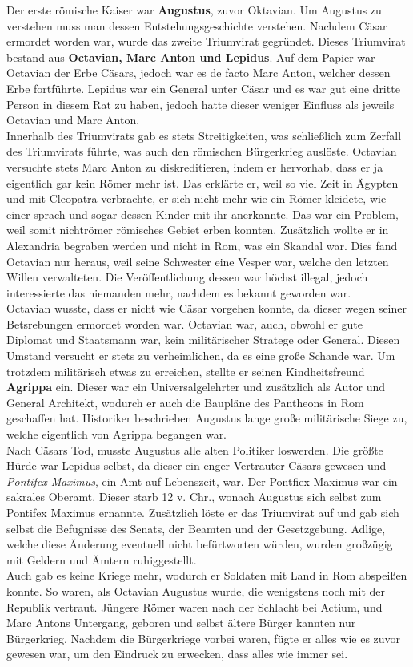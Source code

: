 \documentclass{article}
\begin{document}
	Der erste römische Kaiser war \textbf{Augustus}, zuvor Oktavian. Um Augustus zu verstehen muss man dessen Entstehungsgeschichte verstehen. Nachdem Cäsar ermordet worden war, wurde das zweite Triumvirat gegründet. Dieses Triumvirat bestand aus \textbf{Octavian, Marc Anton und Lepidus}. Auf dem Papier war Octavian der Erbe Cäsars, jedoch war es de facto Marc Anton, welcher dessen Erbe fortführte. Lepidus war ein General unter Cäsar und es war gut eine dritte Person in diesem Rat zu haben, jedoch hatte dieser weniger Einfluss als jeweils Octavian und Marc Anton. \\
	Innerhalb des Triumvirats gab es stets Streitigkeiten, was schließlich zum Zerfall des Triumvirats führte, was auch den römischen Bürgerkrieg auslöste. Octavian versuchte stets Marc Anton zu diskreditieren, indem er hervorhab, dass er ja eigentlich gar kein Römer mehr ist. Das erklärte er, weil so viel Zeit in Ägypten und mit Cleopatra verbrachte, er sich nicht mehr wie ein Römer kleidete, wie einer sprach und sogar dessen Kinder mit ihr anerkannte. Das war ein Problem, weil somit nichtrömer römisches Gebiet erben konnten. Zusätzlich wollte er in Alexandria begraben werden und nicht in Rom, was ein Skandal war. Dies fand Octavian nur heraus, weil seine Schwester eine Vesper war, welche den letzten Willen verwalteten. Die Veröffentlichung dessen war höchst illegal, jedoch interessierte das niemanden mehr, nachdem es bekannt geworden war. \\
	Octavian wusste, dass er nicht wie Cäsar vorgehen konnte, da dieser wegen seiner Betsrebungen ermordet worden war. Octavian war, auch, obwohl er gute Diplomat und Staatsmann war, kein militärischer Stratege oder General. Diesen Umstand versucht er stets zu verheimlichen, da es eine große Schande war. Um trotzdem militärisch etwas zu erreichen, stellte er seinen Kindheitsfreund \textbf{Agrippa} ein. Dieser war ein Universalgelehrter und zusätzlich als Autor und General Architekt, wodurch er auch die Baupläne des Pantheons in Rom geschaffen hat. Historiker beschrieben Augustus lange große militärische Siege zu, welche eigentlich von Agrippa begangen war. \\
	Nach Cäsars Tod, musste Augustus alle alten Politiker loswerden. Die größte Hürde war Lepidus selbst, da dieser ein enger Vertrauter Cäsars gewesen und \textit{Pontifex Maximus}, ein Amt auf Lebenszeit, war. Der Pontfiex Maximus war ein sakrales Oberamt. Dieser starb 12 v. Chr., wonach Augustus sich selbst zum Pontifex Maximus ernannte. Zusätzlich löste er das Triumvirat auf und gab sich selbst die Befugnisse des Senats, der Beamten und der Gesetzgebung. Adlige, welche diese Änderung eventuell nicht befürtworten würden, wurden großzügig mit Geldern und Ämtern ruhiggestellt. \\
	Auch gab es keine Kriege mehr, wodurch er Soldaten mit Land in Rom abspeißen konnte. So waren, als Octavian Augustus wurde, die wenigstens noch mit der Republik vertraut. Jüngere Römer waren nach der Schlacht bei Actium, und Marc Antons Untergang, geboren und selbst ältere Bürger kannten nur Bürgerkrieg. Nachdem die Bürgerkriege vorbei waren, fügte er alles wie es zuvor gewesen war, um den Eindruck zu erwecken, dass alles wie immer sei. \\
\end{document}
